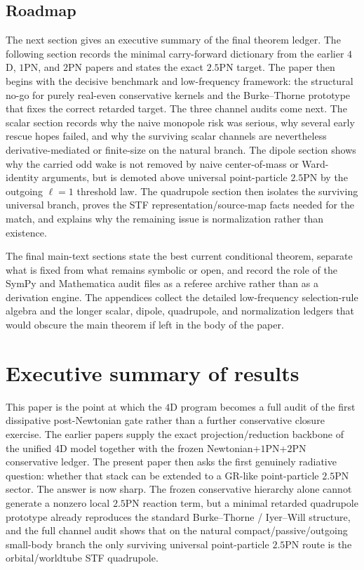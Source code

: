 \documentclass[11pt]{article}
\begin{document}
\subsection{Roadmap}
\label{sec:intro-roadmap}

The next section gives an executive summary of the final theorem ledger.  The
following section records the minimal carry-forward dictionary from the earlier
$4$D, $1$PN, and $2$PN papers and states the exact $2.5$PN target.  The paper
then begins with the decisive benchmark and low-frequency framework: the
structural no-go for purely real-even conservative kernels and the
Burke--Thorne prototype that fixes the correct retarded target.  The three
channel audits come next.  The scalar section records why the naive monopole
risk was serious, why several early rescue hopes failed, and why the surviving
scalar channels are nevertheless derivative-mediated or finite-size on the
natural branch.  The dipole section shows why the carried odd wake is not removed
by naive center-of-mass or Ward-identity arguments, but is demoted above
universal point-particle $2.5$PN by the outgoing $\ell=1$ threshold law.  The
quadrupole section then isolates the surviving universal branch, proves the STF
representation/source-map facts needed for the match, and explains why the
remaining issue is normalization rather than existence.

The final main-text sections state the best current conditional theorem,
separate what is fixed from what remains symbolic or open, and record the role of
the SymPy and Mathematica audit files as a referee archive rather than as a
derivation engine.
The appendices collect the detailed low-frequency selection-rule algebra and the
longer scalar, dipole, quadrupole, and normalization ledgers that would obscure
the main theorem if left in the body of the paper.


\section{Executive summary of results}
\label{sec:executive}

This paper is the point at which the $4$D program becomes a full audit of the
first dissipative post-Newtonian gate rather than a further conservative closure
exercise.  The earlier papers supply the exact projection/reduction backbone of
the unified $4$D model together with the frozen Newtonian+$1$PN+$2$PN
conservative ledger.  The present paper then asks the first genuinely radiative
question: whether that stack can be extended to a GR-like point-particle
$2.5$PN sector.  The answer is now sharp.  The frozen conservative hierarchy
alone cannot generate a nonzero local $2.5$PN reaction term, but a minimal
retarded quadrupole prototype already reproduces the standard
Burke--Thorne / Iyer--Will structure, and the full channel audit shows that on
the natural compact/passive/outgoing small-body branch the only surviving
universal point-particle $2.5$PN route is the orbital/worldtube STF quadrupole.
\end{document}
